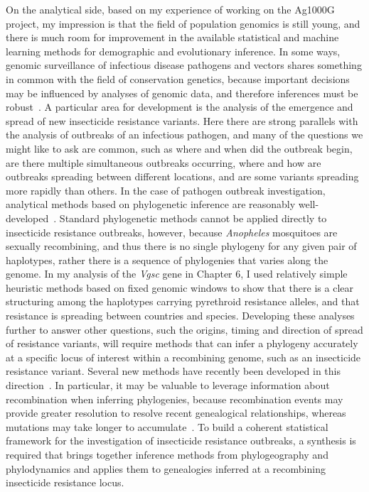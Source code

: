 \begin{refsection}
On the analytical side, based on my experience of working on the Ag1000G project, my impression is that the field of population genomics is still young, and there is much room for improvement in the available statistical and machine learning methods for demographic and evolutionary inference.
%
In some ways, genomic surveillance of infectious disease pathogens and vectors shares something in common with the field of conservation genetics, because important decisions may be influenced by analyses of genomic data, and therefore inferences must be robust~\parencite{McMahon2014,Supple2018}.
%
A particular area for development is the analysis of the emergence and spread of new insecticide resistance variants.
%
Here there are strong parallels with the analysis of outbreaks of an infectious pathogen, and many of the questions we might like to ask are common, such as where and when did the outbreak begin, are there multiple simultaneous outbreaks occurring, where and how are outbreaks spreading between different locations, and are some variants spreading more rapidly than others.
%
In the case of pathogen outbreak investigation, analytical methods based on phylogenetic inference are reasonably well-developed~\parencite{DeMaio2015,Grubaugh2019}.
%
Standard phylogenetic methods cannot be applied directly to insecticide resistance outbreaks, however, because \textit{Anopheles} mosquitoes are sexually recombining, and thus there is no single phylogeny for any given pair of haplotypes, rather there is a sequence of phylogenies that varies along the genome.
%
In my analysis of the \textit{Vgsc} gene in Chapter 6, I used relatively simple heuristic methods based on fixed genomic windows to show that there is a clear structuring among the haplotypes carrying pyrethroid resistance alleles, and that resistance is spreading between countries and species.
%
Developing these analyses further to answer other questions, such the origins, timing and direction of spread of resistance variants, will require methods that can infer a phylogeny accurately at a specific locus of interest within a recombining genome, such as an insecticide resistance variant.
%
Several new methods have recently been developed in this direction~\parencite{Kelleher2019,Speidel2019}.
%
In particular, it may be valuable to leverage information about recombination when inferring phylogenies, because recombination events may provide greater resolution to resolve recent genealogical relationships, whereas mutations may take longer to accumulate~\parencite{Albers2020,Mathieson2014}.
%
To build a coherent statistical framework for the investigation of insecticide resistance outbreaks, a synthesis is required that brings together inference methods from phylogeography and phylodynamics and applies them to genealogies inferred at a recombining insecticide resistance locus.



\end{refsection}
